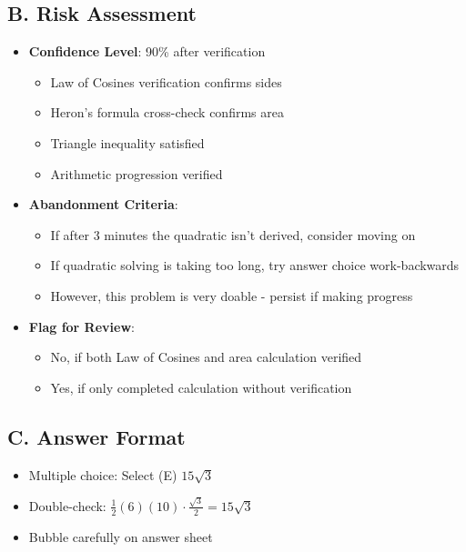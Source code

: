 \documentclass[12pt]{article}
\begin{document}
\begin{competitionbox}
\subsection*{B. Risk Assessment}
\begin{itemize}[leftmargin=*]
    \item \textbf{Confidence Level}: 90\% after verification
    \begin{itemize}
        \item Law of Cosines verification confirms sides
        \item Heron's formula cross-check confirms area
        \item Triangle inequality satisfied
        \item Arithmetic progression verified
    \end{itemize}
    \item \textbf{Abandonment Criteria}: 
    \begin{itemize}
        \item If after 3 minutes the quadratic isn't derived, consider moving on
        \item If quadratic solving is taking too long, try answer choice work-backwards
        \item However, this problem is very doable - persist if making progress
    \end{itemize}
    \item \textbf{Flag for Review}: 
    \begin{itemize}
        \item No, if both Law of Cosines and area calculation verified
        \item Yes, if only completed calculation without verification
    \end{itemize}
\end{itemize}

\subsection*{C. Answer Format}
\begin{itemize}[leftmargin=*]
    \item Multiple choice: Select (E) $15\sqrt{3}$
    \item Double-check: $\frac{1}{2}(6)(10) \cdot \frac{\sqrt{3}}{2} = 15\sqrt{3}$ \checkmark
    \item Bubble carefully on answer sheet
\end{itemize}
\end{competitionbox}
\end{document}
